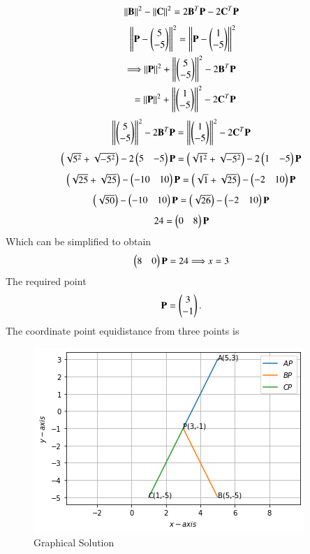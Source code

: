 \documentclass[journal,12pt,twocolumn]{IEEEtran}
\begin{document}
\begin{align}
    \left\lVert\mathbf{B}\right\rVert^2 - \left\lVert\mathbf{C}\right\rVert^2 =2\mathbf{B}^T\mathbf{P} -2\mathbf{C}^T\mathbf{P}
\end{align}
\begin{align}
    \left\lVert\mathbf{P}-\begin{pmatrix}5\\-5\end{pmatrix}\right\rVert^2 =\left\lVert\mathbf{P} - \begin{pmatrix}1\\-5\end{pmatrix}\right\rVert^2\\
    \Longrightarrow \left\lVert\mathbf{P}\right\rVert^2 + \left\lVert\begin{pmatrix}5\\-5\end{pmatrix}\right\rVert^2 -2\mathbf{B}^T\mathbf{P}\\ = \left\lVert\mathbf{P}\right\rVert^2 + \left\lVert\begin{pmatrix}1\\-5\end{pmatrix}\right\rVert^2 -2\mathbf{C}^T\mathbf{P}
\end{align}
\begin{align}
    \left\lVert\begin{pmatrix}5\\-5\end{pmatrix}\right\rVert^2 -2\mathbf{B}^T\mathbf{P} = \left\lVert\begin{pmatrix}1\\-5\end{pmatrix}\right\rVert^2 -2\mathbf{C}^T\mathbf{P}
\end{align}
\begin{align}
    \begin{pmatrix}\sqrt{5^2}+\sqrt{-5^2}\end{pmatrix} -2\begin{pmatrix}5&-5\end{pmatrix}\mathbf{P} = \begin{pmatrix}\sqrt{1^2}+\sqrt{-5^2}\end{pmatrix} -2\begin{pmatrix}1&-5\end{pmatrix}\mathbf{P}         
\end{align}
\begin{align}
    \begin{pmatrix}\sqrt{25}+\sqrt{25}\end{pmatrix} -\begin{pmatrix}-10&10\end{pmatrix}\mathbf{P} = \begin{pmatrix}\sqrt{1}+\sqrt{25}\end{pmatrix} -\begin{pmatrix}-2&10\end{pmatrix}\mathbf{P}
\end{align}
\begin{align}
    \begin{pmatrix}\sqrt{50}\end{pmatrix} -\begin{pmatrix}-10&10\end{pmatrix}\mathbf{P} = \begin{pmatrix}\sqrt{26}\end{pmatrix} -\begin{pmatrix}-2&10\end{pmatrix}\mathbf{P}
\end{align}
\begin{align}
    24 = \begin{pmatrix}0&8\end{pmatrix}\mathbf{P}
\end{align}
Which can be simplified to obtain
\begin{align}
    \begin{pmatrix}8&0\end{pmatrix}\mathbf{P} = 24
    \Longrightarrow x = 3
\end{align}
The required point 
\begin{align}
    \mathbf{P}=\begin{pmatrix}3\\-1\end{pmatrix}.
\end{align}
The coordinate  point  equidistance from three points is
\begin{figure}
    \centering
    \includegraphics[width=\columnwidth]{Figure.png}
    \caption{Graphical Solution}
    \label{fig:my_label}
\end{figure}\\
\end{document}

